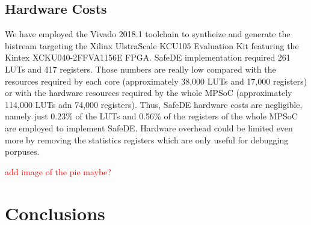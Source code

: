 
\subsection{Hardware Costs}

We have employed the Vivado 2018.1 toolchain to syntheize and generate the bistream targeting the Xilinx UlstraScale KCU105 Evaluation Kit featuring the Kintex XCKU040-2FFVA1156E FPGA. SafeDE implementation required 261 LUTs and 417 registers. Those numbers are really low compared with the resources required by each core (approximately 38,000 LUTs and 17,000 registers) or with the hardware resources required by the whole MPSoC (approximately 114,000 LUTs adn 74,000 registers). Thus, SafeDE hardware costs are negligible, namely just 0.23\% of the LUTs and 0.56\% of the registers of the whole MPSoC are employed to implement SafeDE. Hardware overhead could be limited even more by removing the statistics registers which are only useful for debugging porpuses.

\textcolor{red}{add image of the pie maybe?}


\section{Conclusions}
